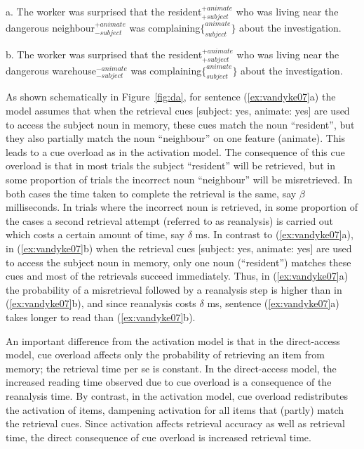 \documentclass{cambridge7A}\usepackage[]{graphicx}\usepackage[]{color}
\begin{document}
\begin{exe}
\ex \label{ex:vandyke07}
\begin{xlist}
\item[a.]
The worker was surprised that the resident$^{+animate}_{+subject}$ who was living near the dangerous neighbour$^{+animate}_{-subject}$ was complaining$\{^{animate}_{subject}\}$ about the investigation.
\item[b.]
The worker was surprised that the resident$^{+animate}_{+subject}$ who was living near the dangerous warehouse$^{-animate}_{-subject}$ was complaining$\{^{animate}_{subject}\}$ about the investigation.
\end{xlist}
\end{exe}

As shown schematically in Figure~\ref{fig:da}, for sentence (\ref{ex:vandyke07}a) the model assumes that when the retrieval cues [subject: yes, animate: yes] are used to access the subject noun in memory, these cues match the noun ``resident'', but they also partially match the noun ``neighbour'' on one feature (animate). This leads to a cue overload as in the activation model. The consequence of this cue overload is that in most trials the subject ``resident'' will be retrieved, but in some proportion of trials the incorrect noun ``neighbour'' will be misretrieved. In both cases the time taken to complete the retrieval is the same, say $\beta$ milliseconds. In trials where the incorrect noun is retrieved, in some proportion of the cases a second retrieval attempt (referred to as reanalysis) is carried out which costs a certain amount of time, say $\delta$ ms. In contrast to (\ref{ex:vandyke07}a), in (\ref{ex:vandyke07}b)  when the retrieval cues [subject: yes, animate: yes] are used to access the subject noun in memory, only one noun (``resident'') matches these cues and most of the retrievals succeed immediately. Thus, in (\ref{ex:vandyke07}a) the probability of a misretrieval followed by a reanalysis step is higher than in (\ref{ex:vandyke07}b), and since reanalysis costs $\delta$ ms, sentence (\ref{ex:vandyke07}a) takes longer to read than (\ref{ex:vandyke07}b). 

An important difference from the activation model is that in the direct-access model, cue overload affects only the probability of retrieving an item from memory; the retrieval time per se is constant. In the direct-access model, the increased reading time observed due to cue overload is a consequence of the reanalysis time. 
By contrast, in the activation model, cue overload redistributes the activation of items, dampening activation for all items that (partly) match the retrieval cues. Since activation affects retrieval accuracy as well as retrieval time, the direct consequence of cue overload is increased retrieval time. 
\end{document}
